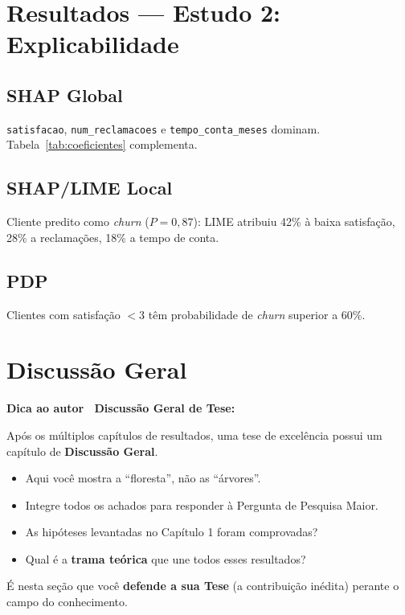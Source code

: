 \documentclass[
    12pt,
    oneside,
    a4paper,
    english,
    brazilian
    ]{abntex2}
\numberwithin{equation}{chapter}
\newenvironment{dica}{%
    \par\medskip
    \color{blue!60!black}\small\itshape
}{%
    \par\medskip
}
\begin{document}
\chapter{Resultados --- Estudo 2: Explicabilidade}

\section{SHAP Global}

\texttt{satisfacao}, \texttt{num\_reclamacoes} e \texttt{tempo\_conta\_meses} dominam. Tabela~\ref{tab:coeficientes} complementa.



\section{SHAP/LIME Local}

Cliente predito como \textit{churn} ($P = 0,87$): LIME atribuiu 42\% à baixa satisfação, 28\% a reclamações, 18\% a tempo de conta.

\section{PDP}

Clientes com satisfação $< 3$ têm probabilidade de \textit{churn} superior a 60\%.

\chapter{Discussão Geral}

\begin{dica}
\noindent\textbf{Dica ao autor \textemdash\ Discussão Geral de Tese:}

Após os múltiplos capítulos de resultados, uma tese de excelência possui um capítulo de \textbf{Discussão Geral}.
\begin{itemize}
    \item Aqui você mostra a ``floresta'', não as ``árvores''.
    \item Integre todos os achados para responder à Pergunta de Pesquisa Maior.
    \item As hipóteses levantadas no Capítulo 1 foram comprovadas?
    \item Qual é a \textbf{trama teórica} que une todos esses resultados?
\end{itemize}
É nesta seção que você \textbf{defende a sua Tese} (a contribuição inédita) perante o campo do conhecimento.
\end{dica}
\end{document}
